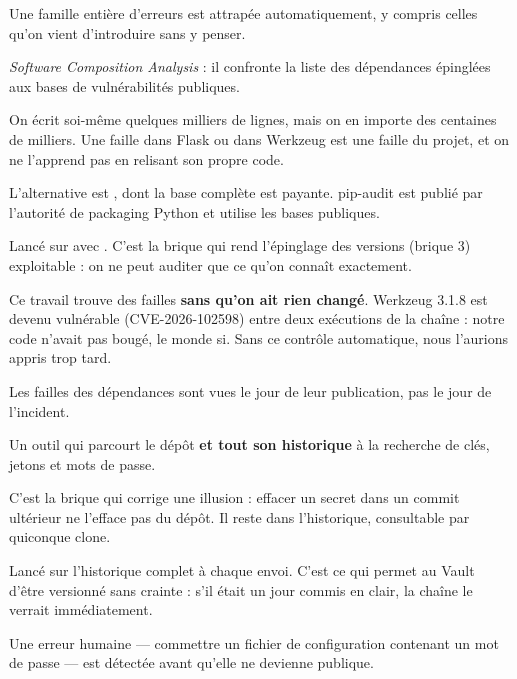 \apport
Une famille entière d'erreurs est attrapée automatiquement, y compris celles
qu'on vient d'introduire sans y penser.


\quoi
\emph{Software Composition Analysis} : il confronte la liste des dépendances
épinglées aux bases de vulnérabilités publiques.

\pourquoi
On écrit soi-même quelques milliers de lignes, mais on en importe des
centaines de milliers. Une faille dans Flask ou dans Werkzeug est une faille du
projet, et on ne l'apprend pas en relisant son propre code.

L'alternative est , dont la base complète est payante. pip-audit est
publié par l'autorité de packaging Python et utilise les bases publiques.

\role
Lancé sur  avec . C'est la brique qui
rend l'épinglage des versions (brique 3) exploitable : on ne peut auditer que ce
qu'on connaît exactement.

\begin{retenir}
Ce travail trouve des failles \textbf{sans qu'on ait rien changé}. Werkzeug
3.1.8 est devenu vulnérable (CVE-2026-102598) entre deux exécutions de la
chaîne : notre code n'avait pas bougé, le monde si. Sans ce contrôle
automatique, nous l'aurions appris trop tard.
\end{retenir}

\apport
Les failles des dépendances sont vues le jour de leur publication, pas le jour
de l'incident.


\quoi
Un outil qui parcourt le dépôt \textbf{et tout son historique} à la recherche de
clés, jetons et mots de passe.

\pourquoi
C'est la brique qui corrige une illusion : effacer un secret dans un commit
ultérieur ne l'efface pas du dépôt. Il reste dans l'historique, consultable par
quiconque clone.

\role
Lancé sur l'historique complet à chaque envoi. C'est ce qui permet au Vault
d'être versionné sans crainte : s'il était un jour commis en clair, la chaîne le
verrait immédiatement.

\apport
Une erreur humaine --- commettre un fichier de configuration contenant un mot de
passe --- est détectée avant qu'elle ne devienne publique.

